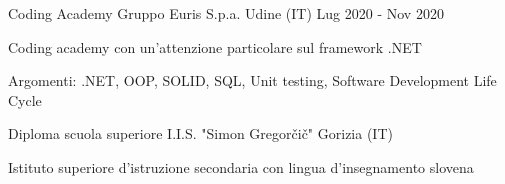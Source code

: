 

\begin{cventries}

\cventry
    {Coding Academy} %
    {Gruppo Euris S.p.a.} %
    {Udine (IT)} %
    {Lug 2020 - Nov 2020} %
    {
      \begin{cvitems} %
        \item {Coding academy con un'attenzione particolare sul framework .NET}
        \item {Argomenti: .NET, OOP, SOLID, SQL, Unit testing, Software Development Life Cycle}
      \end{cvitems}
    }

\cventry
    {Diploma scuola superiore} %
    {I.I.S. "Simon Gregorčič"} %
    {Gorizia (IT)} %
    {} %
    {
      \begin{cvitems} %
        \item {Istituto superiore d'istruzione secondaria con lingua d'insegnamento slovena}
      \end{cvitems}
    }
\end{cventries}
